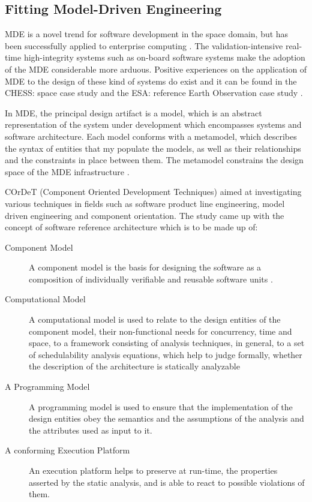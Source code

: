\subsection{Fitting Model-Driven Engineering}
MDE is a novel trend for software development in the space domain, but has been successfully applied to enterprise computing \cite{CompBasedDev}. The validation-intensive real-time high-integrity systems such as on-board software systems make the adoption of the MDE considerable more arduous. Positive experiences on the application of MDE to the design of these kind of systems do exist and it can be found in the CHESS: space case study \cite{CompBasedProcess} and the ESA: reference Earth Observation case study \cite{CompBasedProcess}.

In MDE, the principal design artifact is a model, which is an abstract representation of the system under development which encompasses systems and software architecture. Each model conforms with a metamodel, which describes the syntax of entities that my populate the models, as well as their relationships and the constraints in place between them. The metamodel constrains the design space of the MDE infrastructure \cite{Metamodelling}.  

COrDeT (Component Oriented Development Techniques) aimed at investigating various techniques in fields such as software product line engineering, model driven engineering and component orientation. The study came up with the concept of software reference architecture which is to be made up of: \cite{CORDET} \cite{SoftRefArch} \cite{SAVOIR}

\begin{description}
\item [Component Model] A component model is the basis for designing the software as a composition of individually verifiable and reusable software units \cite{ComponentModel}.

\item [Computational Model] A computational model is used to relate to the design entities of the component model, their non-functional needs for concurrency, time and space, to a framework consisting of analysis techniques, in general, to a set of schedulability analysis equations, which help to judge formally, whether the description of the architecture is statically analyzable \cite{ScheduAnaly}

\item [A Programming Model] A programming model is used to ensure that the implementation of the design entities obey the semantics and the assumptions of the analysis and the attributes used as input to it.\cite{CharEvoRAVCodeAr}

\item [A conforming Execution Platform] An execution platform helps to preserve at run-time, the properties asserted by the static analysis, and is able to react to possible violations of them.  
\end{description}

